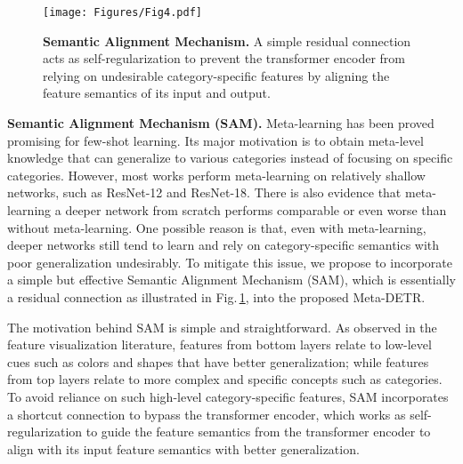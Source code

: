 \documentclass[10pt,twocolumn,letterpaper]{article}
\begin{document}
\begin{figure}[t!] 
\begin{center}
   \texttt{[image: Figures/Fig4.pdf]}
\end{center}
\vspace*{-1.5mm}
   \caption{\textbf{Semantic Alignment Mechanism.} A simple residual connection acts as self-regularization to prevent the transformer encoder from relying on undesirable category-specific features by aligning the feature semantics of its input and output.}
\label{fig:fig4_semantic_alignment}
\vspace*{-1.0mm}
\end{figure}

\medskip
\noindent
\textbf{Semantic Alignment Mechanism (SAM).}
Meta-learning has been proved promising for few-shot learning. Its major motivation is to obtain meta-level knowledge that can generalize to various categories instead of focusing on specific categories. However, most works\;\cite{MetaOptNet,CloserFewshotClassification,Li2019FindingTF,ye2020fewshot,DeepEMD} perform meta-learning on relatively shallow networks, such as ResNet-12 and ResNet-18. There is also evidence\;\cite{DeepMetaLearning,DynamicFewshotWOForgetting,CloserFewshotClassification,Act2Param} that meta-learning a deeper network from scratch performs comparable or even worse than without meta-learning. One possible reason is that, even with meta-learning, deeper networks still tend to learn and rely on category-specific semantics with poor generalization undesirably. To mitigate this issue, we propose to incorporate a simple but effective Semantic Alignment Mechanism (SAM), which is essentially a residual connection as illustrated in Fig.\,\ref{fig:fig4_semantic_alignment}, into the proposed Meta-DETR.

The motivation behind SAM is simple and straightforward. As observed in the feature visualization literature\;\cite{Zeiler2014VisualizingAU,understanding-neural-networks}, features from bottom layers relate to low-level cues such as colors and shapes that have better generalization; while features from top layers relate to more complex and specific concepts such as categories. To avoid reliance on such high-level category-specific features, SAM incorporates a shortcut connection to bypass the transformer encoder, which works as self-regularization to guide the feature semantics from the transformer encoder to align with its input feature semantics with better generalization.
\end{document}
